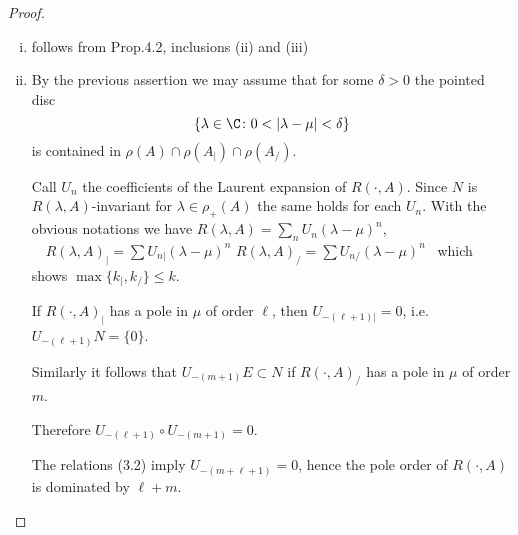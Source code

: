 \begin{proof}
\begin{enumerate}[(i)]
\item 
follows from Prop.4.2, inclusions (ii) and (iii)

\item 
By the previous assertion we may assume that for some $\delta > 0$ the pointed disc
\[
\{\lambda \in \C \colon 0 < |\lambda-\mu| < \delta\}
\]
is contained in $\rho(A) \cap \rho(A_{|}) \cap \rho(A_{/})$.

Call $U_{n}$ the coefficients of the Laurent expansion of $R(\cdot,A)$.
Since $N$ is $R(\lambda,A)$-invariant for $\lambda \in \rho_{+}(A)$ the same holds for each $U_{n}$.
With the obvious notations we have \quad
$R(\lambda,A) = \sum_{n} U_{n}(\lambda-\mu)^{n}$, $\quad R(\lambda,A)_{|} = \sum U_{n|}(\lambda-\mu)^{n}$ \quad {} \quad $R(\lambda,A)_{/} = \sum U_{n/}(\lambda-\mu)^{n}$~
which shows $\max\{k_{|},k_{/}\} \leq k$.

If $R(\cdot,A)_{|}$ has a pole in $\mu$ of order $\ell$, then $U_{-(\ell+1)|} = 0$, i.e. $U_{-(\ell+1)}N = \{0\}$.

Similarly it follows that $U_{-(m+1)}E \subset N$ if $R(\cdot,A)_{/}$ has a pole in $\mu$ of order $m$.

Therefore $U_{-(\ell+1)} \circ U_{-(m+1)} = 0$.

The relations (3.2) imply $U_{-(m+\ell+1)} = 0$, hence the pole order of $R(\cdot,A)$ is dominated by $\ell + m$.
\end{enumerate}
\end{proof}

